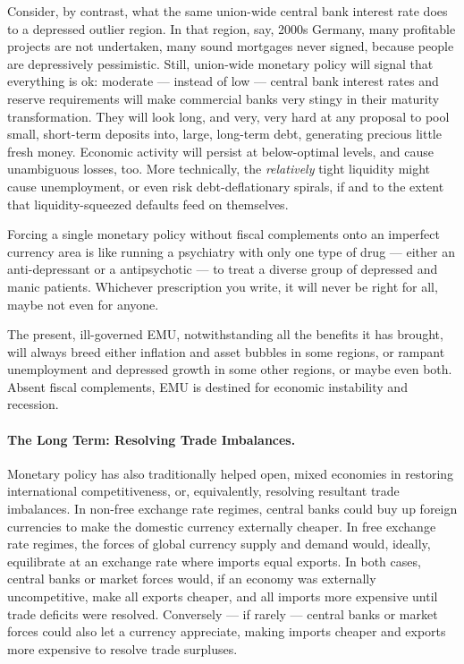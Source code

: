 \documentclass[11pt,a4paper,oneside,openright]{article}
\begin{document}
Consider, by contrast, what the same union-wide central bank interest rate does to a depressed outlier region. In that region, say, 2000s Germany, many profitable projects are not undertaken, many sound mortgages never signed, because people are depressively pessimistic. Still, union-wide monetary policy will signal that everything is ok: moderate --- instead of low --- central bank interest rates and reserve requirements will make commercial banks very stingy in their maturity transformation. They will look long, and very, very hard at any proposal to pool small, short-term deposits into, large, long-term debt, generating precious little fresh money. Economic activity will persist at below-optimal levels, and cause unambiguous losses, too. More technically, the \emph{relatively} tight liquidity might cause unemployment, or even risk debt-deflationary spirals, if and to the extent that liquidity-squeezed defaults feed on themselves.

Forcing a single monetary policy without fiscal complements onto an imperfect currency area is like running a psychiatry with only one type of drug --- either an anti-depressant or a antipsychotic --- to treat a diverse group of depressed and manic patients. Whichever prescription you write, it will never be right for all, maybe not even for anyone.

The present, ill-governed \gls{EMU}, notwithstanding all the benefits it has brought, will always breed either inflation and asset bubbles in some regions, or rampant unemployment and depressed growth in some other regions, or maybe even both. Absent fiscal complements, \gls{EMU} is destined for economic instability and recession.

\paragraph[Long Term]{The Long Term: Resolving Trade Imbalances.} Monetary policy has also traditionally helped open, mixed economies in restoring international competitiveness, or, equivalently, resolving resultant trade imbalances. In non-free exchange rate regimes, central banks could buy up foreign currencies to make the domestic currency externally cheaper. In free exchange rate regimes, the forces of global currency supply and demand would, ideally, equilibrate at an exchange rate where imports equal exports. In both cases, central banks or market forces would, if an economy was externally uncompetitive, make all exports cheaper, and all imports more expensive until trade deficits were resolved. Conversely --- if rarely --- central banks or market forces could also let a currency appreciate, making imports cheaper and exports more expensive to resolve trade surpluses.
\end{document}
